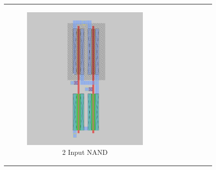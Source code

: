 \documentclass[conference]{IEEEtran}
\begin{document}
\begin{figure}[H]
    \centering
    \begin{tabular}{cc}
        \begin{subfigure}{0.44\linewidth}
            \centering
            \includegraphics[width=\textwidth]{images/nand_cmos_layout.png}
            \caption{2 Input NAND}
        \end{subfigure} &
        \begin{subfigure}{0.44\linewidth}
            \centering

\end{subfigure}
\end{tabular}
\end{figure}
\end{document}
